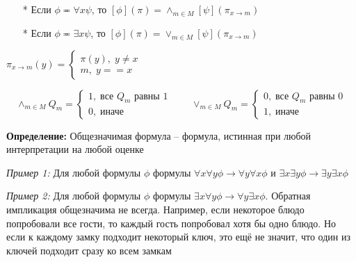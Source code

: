 \hfill \break
\begin{minipage}{0.6\textwidth}
  \begin{itemize}
    \item[*] Если $\phi\eqcirc \forall x \psi$, то $[\phi](\pi)=\land_{m\in M}[\psi](\pi_{x\to m})$
    \item[*] Если $\phi\eqcirc \exists x \psi$, то $[\phi](\pi)=\lor_{m\in M}[\psi](\pi_{x\to m})$
    \end{itemize}
\end{minipage}
\hfill
\begin{minipage}{0.4\textwidth}
    $\pi_{x\to m} (y)= 
    \begin{cases}
        \pi(y), \; y\neq x \\
        m, \; y==x
    \end{cases}$
\end{minipage}
$$
\land_{m\in M}Q_m=
    \begin{cases}
        1, \; \text{все }Q_m \text{ равны 1} \\
        0, \; \text{иначе}
    \end{cases}
    \qquad 
\lor_{m\in M}Q_m=
    \begin{cases}
        0, \; \text{все }Q_m \text{ равны 0} \\
        1, \; \text{иначе}
    \end{cases}
$$

\hfill \break
\textbf{Определение:} Общезначимая формула -- формула, истинная при любой интерпретации на любой оценке

\textit{Пример 1:} Для любой формулы $\phi$ формулы $\forall x\forall y\phi \to \forall y\forall x\phi$ и $\exists x\exists y\phi \to \exists y\exists x\phi$

\textit{Пример 2:} Для любой формулы $\phi$ формулы $\exists x\forall y\phi \to \forall y\exists x\phi$. Обратная импликация общезначима не всегда. Например, если некоторое блюдо попробовали все гости, то каждый гость попробовал хотя бы одно блюдо. Но если к каждому замку подходит некоторый ключ, это ещё не значит, что один из ключей подходит сразу ко всем замкам

